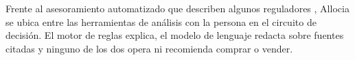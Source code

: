 Frente al asesoramiento automatizado que describen algunos reguladores \parencite{IOSCO2025ai}, Allocia se ubica entre las herramientas de análisis con la persona en el circuito de decisión. El motor de reglas explica, el modelo de lenguaje redacta sobre fuentes citadas y ninguno de los dos opera ni recomienda comprar o vender.
